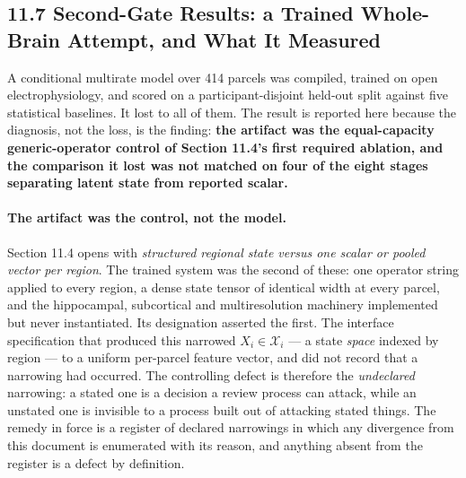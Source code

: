 \subsection{11.7 Second-Gate Results: a Trained Whole-Brain Attempt, and
What It Measured}

A conditional multirate model over 414 parcels was compiled, trained on open
electrophysiology, and scored on a participant-disjoint held-out split against
five statistical baselines. It lost to all of them. The result is reported
here because the diagnosis, not the loss, is the finding: \textbf{the artifact
was the equal-capacity generic-operator control of Section 11.4's first
required ablation, and the comparison it lost was not matched on four of the
eight stages separating latent state from reported scalar.}

\paragraph{The artifact was the control, not the model.}
Section 11.4 opens with \emph{structured regional state versus one scalar or
pooled vector per region}. The trained system was the second of these: one
operator string applied to every region, a dense state tensor of identical
width at every parcel, and the hippocampal, subcortical and multiresolution
machinery implemented but never instantiated. Its designation asserted the
first. The interface specification that produced this narrowed
\(X_i \in \mathcal X_i\) --- a state \emph{space} indexed by region --- to a
uniform per-parcel feature vector, and did not record that a narrowing had
occurred. The controlling defect is therefore the \emph{undeclared} narrowing:
a stated one is a decision a review process can attack, while an unstated one
is invisible to a process built out of attacking stated things. The remedy in
force is a register of declared narrowings in which any divergence from this
document is enumerated with its reason, and anything absent from the register
is a defect by definition.

